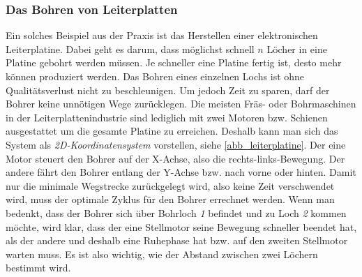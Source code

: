 \documentclass{article}
\begin{document}
\subsubsection{Das Bohren von Leiterplatten}

Ein solches Beispiel aus der Praxis ist das Herstellen einer elektronischen Leiterplatine. Dabei geht es darum, dass möglichst schnell $n$ Löcher in eine Platine gebohrt werden müssen. Je schneller eine Platine fertig ist, desto mehr können produziert werden. Das Bohren eines einzelnen Lochs ist ohne Qualitätsverlust nicht zu beschleunigen. Um jedoch Zeit zu sparen, darf der Bohrer keine unnötigen Wege zurücklegen. Die meisten Fräs- oder Bohrmaschinen in der Leiterplattenindustrie sind lediglich mit zwei Motoren bzw. Schienen ausgestattet um die gesamte Platine zu erreichen. Deshalb kann man sich das System als \textit{2D-Koordinatensystem} vorstellen, siehe \autoref{abb_leiterplatine}. Der eine Motor steuert den Bohrer auf der X-Achse, also die rechts-links-Bewegung. Der andere fährt den Bohrer entlang der Y-Achse bzw. nach vorne oder hinten. Damit nur die minimale Wegstrecke zurückgelegt wird, also keine Zeit verschwendet wird, muss der optimale Zyklus für den Bohrer errechnet werden. Wenn man bedenkt, dass der Bohrer sich über Bohrloch \textit{1} befindet und zu Loch \textit{2} kommen möchte, wird klar, dass der eine Stellmotor seine Bewegung schneller beendet hat, als der andere und deshalb eine Ruhephase hat bzw. auf den zweiten Stellmotor warten muss. Es ist also wichtig, wie der Abstand zwischen zwei Löchern bestimmt wird.
\end{document}
